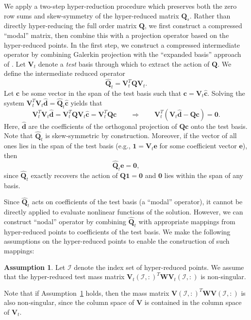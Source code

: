 \documentclass[preprint,10pt]{elsarticle}
\theoremstyle{definition}
\theoremstyle{lemma}
\theoremstyle{theorem}
\theoremstyle{assumption}
\newtheorem{assumption}{Assumption}
\renewcommand{\hat}{\widehat}
\newcommand{\LRp}[1]{\left( #1 \right)}
\begin{document}
We apply a two-step hyper-reduction procedure which preserves both the zero row sums and skew-symmetry of the hyper-reduced matrix $\bm{Q}_s$.  Rather than directly hyper-reducing the full order matrix $\bm{Q}$, we first construct a compressed ``modal'' matrix, then combine this with a projection operator based on the hyper-reduced points.  In the first step, we construct a compressed intermediate operator by combining  Galerkin projection with the ``expanded basis'' approach of \cite{hernandez2017dimensional}.  Let $\bm{V}_t$ denote a \textit{test} basis through which to extract the action of $\bm{Q}$.  We define the intermediate reduced operator 
\begin{equation}
\hat{\bm{Q}}_{t} = \bm{V}_{t}^T\bm{Q}\bm{V}_{t}.
\label{eq:compressQ}
\end{equation}
Let $\bm{c}$ be some vector in the span of the test basis such that $\bm{c}=\bm{V}_t \hat{\bm{c}}$. Solving the system $\bm{V}_t^T\bm{V}_t \hat{\bm{d}} = \hat{\bm{Q}}_t\hat{\bm{c}}$ yields that
\[
\bm{V}_t^T\bm{V}_t \hat{\bm{d}} = \bm{V}_t^T\bm{Q}\bm{V}_t\hat{\bm{c}} = \bm{V}_t^T\bm{Q}\bm{c} \qquad \Longrightarrow\qquad \bm{V}_t^T \LRp{\bm{V}_t\hat{\bm{d}}-\bm{Q}\bm{c}} = \bm{0}.
\]
Here, $\hat{\bm{d}}$ are the coefficients of the orthogonal projection of $\bm{Q}\bm{c}$ onto the test basis.  Note that $\hat{\bm{Q}}_t$ is skew-symmetric by construction.  Moreover, if the vector of all ones lies in the span of the test basis (e.g., $\bm{1} = \bm{V}_t\bm{e}$ for some coefficient vector $\bm{e}$), then 
\[
\hat{\bm{Q}}_t\bm{e} = \bm{0},
\]
since $\hat{\bm{Q}}_t$ exactly recovers the action of $\bm{Q}\bm{1} = \bm{0}$ and $\bm{0}$ lies within the span of any basis.  


Since $\hat{\bm{Q}}_{t}$ acts on coefficients of the test basis (a ``modal'' operator), it cannot be directly applied to evaluate nonlinear functions of the solution.  However, we can construct ``nodal'' operator by combining $\hat{\bm{Q}}_t$ with appropriate mappings from hyper-reduced points to coefficients of the test basis.  We make the following assumptions on the hyper-reduced points to enable the construction of such mappings: 
\begin{assumption}
Let $\mathcal{I}$ denote the index set of hyper-reduced points.  We assume that the hyper-reduced test mass matrix $\bm{V}_t\LRp{\mathcal{I},:}^T\bm{W}\bm{V}_t\LRp{\mathcal{I},:}$ is non-singular.
 \label{ass:quad}
\end{assumption}
Note that if Assumption~\ref{ass:quad} holds, then the mass matrix $\bm{V}\LRp{\mathcal{I},:}^T\bm{W}\bm{V}\LRp{\mathcal{I},:}$ is also non-singular, since the column space of $\bm{V}$ is contained in the column space of $\bm{V}_t$.  
\end{document}
